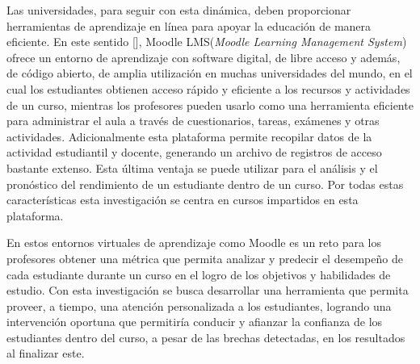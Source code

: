 Las universidades, para seguir con esta dinámica, deben proporcionar herramientas de aprendizaje en línea para apoyar la educación 
de manera eficiente. En este sentido [\cite{Moodle_Solutions}], Moodle LMS(\textit{Moodle Learning Management System})
ofrece un entorno de aprendizaje con software digital, de libre acceso y además, de código abierto, de amplia utilización en muchas universidades del mundo, en el cual los estudiantes obtienen acceso rápido y eficiente a los recursos y actividades 
de un curso, mientras los profesores pueden usarlo como una herramienta eficiente para administrar el 
aula a través de cuestionarios, tareas, exámenes y otras actividades. Adicionalmente esta plataforma permite recopilar datos 
de la actividad estudiantil y docente, generando un archivo de registros de acceso bastante extenso. Esta última ventaja 
se puede utilizar para el análisis y el pronóstico del rendimiento de un estudiante dentro de un curso. Por todas estas 
características esta investigación se centra en cursos impartidos en esta plataforma.

En estos entornos virtuales de aprendizaje como Moodle es un reto para los profesores obtener una métrica que permita analizar 
y predecir el desempeño de cada estudiante durante un curso en el logro de los objetivos y habilidades
de estudio. Con esta investigación se busca desarrollar una herramienta que permita proveer, a tiempo, una 
atención personalizada a los estudiantes, logrando una intervención oportuna que permitiría conducir y 
afianzar la confianza de los estudiantes dentro del curso, a pesar de las brechas detectadas, en los resultados al 
finalizar este.

